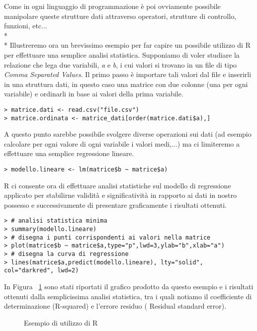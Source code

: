 \documentclass[12pt,a4paper,openright,twoside]{report}
\begin{document}
Come in ogni linguaggio di programmazione è poi ovviamente possibile manipolare queste strutture dati attraverso operatori, strutture di controllo, funzioni, etc...\\* \\*
Illustreremo ora un brevissimo esempio per far capire un possibile utilizzo di R per effettuare una semplice analisi statistica. Supponiamo di voler studiare la relazione che lega due variabili, \emph{a} e \emph{b}, i cui valori si trovano in un file di tipo \emph{Comma Separated Values}. Il primo passo è importare tali valori dal file e inserirli in una struttura dati, in questo caso una matrice con due colonne (una per ogni variabile) e ordinarli in base ai valori della prima variabile.

\lstset{language=R}
\begin{lstlisting}
> matrice.dati <- read.csv("file.csv")
> matrice.ordinata <- matrice_dati[order(matrice.dati$a),]
\end{lstlisting}

A questo punto sarebbe possibile svolgere diverse operazioni sui dati (ad esempio calcolare per ogni valore di ogni variabile i valori medi,...) ma ci limiteremo a effettuare una semplice regressione lineare.
\begin{lstlisting}
> modello.lineare <- lm(matrice$b ~ matrice$a)
\end{lstlisting}

R ci consente ora di effettuare analisi statistiche sul modello di regressione applicato per stabilirne validità e significatività in rapporto ai dati in nostro possesso e successivamente di presentare graficamente i risultati ottenuti.
\begin{lstlisting}
> # analisi statistica minima
> summary(modello.lineare)       
> # disegna i punti corrispondenti ai valori nella matrice
> plot(matrice$b ~ matrice$a,type="p",lwd=3,ylab="b",xlab="a")    
> # disegna la curva di regressione
> lines(matrice$a,predict(modello.lineare), lty="solid", col="darkred", lwd=2)    
\end{lstlisting}


In Figura ~\ref{example_r} sono stati riportati il grafico prodotto da questo esempio e i risultati ottenuti dalla semplicissima analisi statistica, tra i quali notiamo il coefficiente di determinazione (R-squared) e l'errore residuo ( 
Residual standard error).

\begin{figure}[H]
	\centering
	\quad
	\caption{Esempio di utilizzo di R}
	\label{example_r}
\end{figure}
\end{document}
